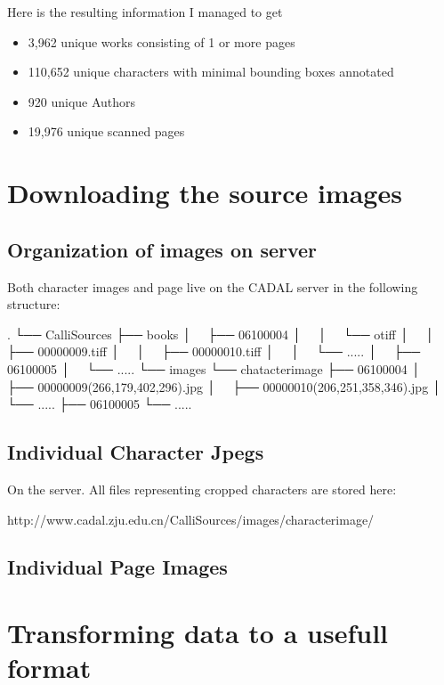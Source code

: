 Here is the resulting information I managed to get 

\begin{itemize}
    \item 3,962 unique works consisting of 1 or more pages
    \item 110,652 unique characters with minimal bounding boxes annotated
    \item 920 unique Authors
    \item 19,976 unique scanned pages
\end{itemize}



\section{Downloading the source images}

\subsection{Organization of images on server}

Both character images and page live on the CADAL server in the following structure:


.
└── CalliSources
    ├── books
    │   ├── 06100004
    │   │   └── otiff
    │   │       ├── 00000009.tiff
    │   │       ├── 00000010.tiff
    │   │       └── .....
    │   ├── 06100005
    │   └── .....
    └── images
        └── chatacterimage
            ├── 06100004
            │   ├── 00000009(266,179,402,296).jpg
            │   ├── 00000010(206,251,358,346).jpg
            │   └── .....
            ├── 06100005
            └── .....




\subsection{Individual Character Jpegs}

On the server.  All files representing cropped characters are stored here:

http://www.cadal.zju.edu.cn/CalliSources/images/characterimage/


\subsection{Individual Page Images}





\section{Transforming data to a usefull format}

